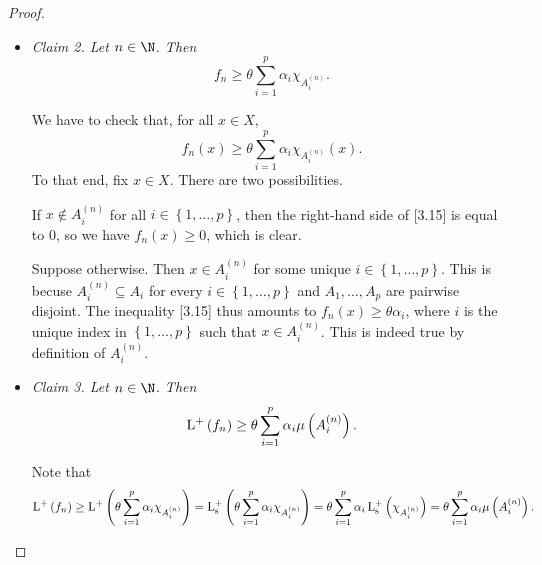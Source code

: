 \documentclass[pmath450]{subfiles}
\begin{document}
\begin{proof}
\begin{itemize}
            \item \textit{Claim 2. Let $n\in\N$. Then
                \begin{equation*}
                    f_n \geq \theta\sum^{p}_{i=1}\alpha_i\chi_{A_i^{\left( n \right)}}.
                \end{equation*}}

                \begin{subproof}
                    We have to check that, for all $x\in X$,
                    \begin{equation}
                        f_n\left( x \right)\geq\theta\sum^{p}_{i=1}\alpha_i\chi_{A^{\left( n \right)}_i}\left( x \right).
                    \end{equation}
                    To that end, fix $x\in X$. There are two possibilities.

                    If $x\notin A_i^{\left( n \right)}$ for all $i\in\left\lbrace 1,\ldots,p \right\rbrace$, then the right-hand side of [3.15] is equal to $0$, so we have $f_n\left( x \right)\geq 0$, which is clear.

                    Suppose otherwise. Then $x\in A_i^{\left( n \right)}$ for some unique $i\in\left\lbrace 1,\ldots,p \right\rbrace$. This is becuse $A_i^{\left( n \right)}\subseteq A_i$ for every $i\in\left\lbrace 1,\ldots,p \right\rbrace$ and $A_1,\ldots,A_p$ are pairwise disjoint. The inequality [3.15] thus amounts to $f_n\left( x \right)\geq\theta\alpha_i$, where $i$ is the unique index in $\left\lbrace 1,\ldots,p \right\rbrace$ such that $x\in A_i^{\left( n \right)}$. This is indeed true by definition of $A^{\left( n \right)}_i$.
                \end{subproof}

            \item \textit{Claim 3. Let $n\in\N$. Then
                \begin{equation*}
                    \operatorname{L^+}\left( f_n \right) \geq\theta\sum^{p}_{i=1}\alpha_i\mu\left( A_i^{\left( n \right)} \right).
                \end{equation*}}

                \begin{subproof}
                    Note that
                    \begin{equation*}
                        \operatorname{L^+}\left( f_n \right) \geq \operatorname{L^+}\left( \theta\sum^{p}_{i=1}\alpha_i\chi_{A_i^{\left( n \right)}} \right) = \operatorname{L^+_s}\left( \theta\sum^{p}_{i=1}\alpha_i\chi_{A_i^{\left( n \right)}} \right) = \theta\sum^{p}_{i=1}\alpha_i\operatorname{L^+_s}\left( \chi_{A_i^{\left( n \right)}} \right) = \theta\sum^{p}_{i=1}\alpha_i\mu\left( A_i^{\left( n \right)} \right).
                    \end{equation*}
                \end{subproof}


\end{itemize}
\end{proof}
\end{document}
